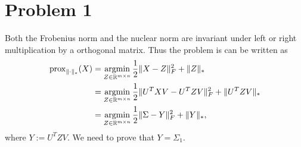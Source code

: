 \section{Problem 1}

Both the Frobenius norm and the nuclear norm are invariant
under left or right multiplication by a orthogonal matrix.
Thus the problem is can be written as
\begin{equation}
\begin{split}
    {\mathop{\mathrm{prox}}}_{\|\cdot\|_*}(X)
        &= \mathop{\mathrm{argmin}}_{Z\in{\mathbb{R}}^{m\times n}}\frac{1}{2}\|X-Z\|_F^2+\|Z\|_* \\
        &= \mathop{\mathrm{argmin}}_{Z\in{\mathbb{R}}^{m\times n}}\frac{1}{2}\|U^TXV-U^TZV\|_F^2+\|U^TZV\|_* \\
        &= \mathop{\mathrm{argmin}}_{Z\in{\mathbb{R}}^{m\times n}}\frac{1}{2}\|\Sigma-Y\|_F^2+\|Y\|_*, \\
\end{split}
\end{equation}
where $Y:=U^TZV$.
We need to prove that $Y=\Sigma_1$.
